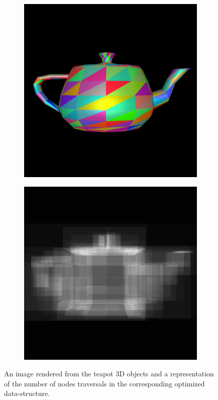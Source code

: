 \documentclass[a4paper,11pt]{article}%
\begin{document}
\begin{figure}[h]
    \centering
    
\begin{subfigure}{.5\textwidth}
  \centering
  \includegraphics[width=.9\linewidth]{img/teapot.png}
\end{subfigure}%
\begin{subfigure}{.5\textwidth}
  \centering
  \includegraphics[width=.9\linewidth]{img/tbteapot.png}
\end{subfigure}    
    
    \caption{An image rendered from the teapot 3D objects and a representation of the number of nodes traversals in the corresponding optimized data-structure.}
    \label{fig:dsteapot}
\end{figure}
\end{document}
